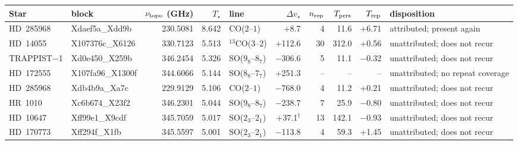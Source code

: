 \begin{tabular}{@{}l@{~}l@{~}r@{~}r@{~}l@{~}r@{~~}r@{~}r@{~}r@{~}l@{}}
\hline
Star & block & $\nu_{\rm topo}$ (GHz) & $T_\star$ & line & $\Delta v_\star$ & $n_{\rm rep}$ & $T_{\rm pers}$ & $T_{\rm rep}$ & disposition \\
\hline
HD~285968 & Xdaef5a\_Xdd9b & 230.5081 & 8.642 & CO($2$--$1$) & +8.7 & 4 & 11.6 & +6.71 & attributed; present again \\
HD~14055 & X107376c\_X6126 & 330.7123 & 5.513 & $^{13}$CO($3$--$2$) & +112.6 & 30 & 312.0 & +0.56 & unattributed; does not recur \\
TRAPPIST$-$1 & Xd0e450\_X259b & 346.2454 & 5.326 & SO($9_{8}$--$8_{7}$) & \ensuremath{-}306.6 & 5 & 11.1 & \ensuremath{-}0.32 & unattributed; does not recur \\
HD~172555 & X107fa96\_X1300f & 344.6066 & 5.144 & SO($8_{8}$--$7_{7}$) & +251.3 & -- & -- & -- & unattributed; no repeat coverage \\
HD~285968 & Xdb4b9a\_Xa7c & 229.9129 & 5.106 & CO($2$--$1$) & \ensuremath{-}768.0 & 4 & 11.2 & +0.21 & unattributed; does not recur \\
HR~1010 & Xc6b674\_X23f2 & 346.2301 & 5.044 & SO($9_{8}$--$8_{7}$) & \ensuremath{-}238.7 & 7 & 25.9 & \ensuremath{-}0.80 & unattributed; does not recur \\
HD~10647 & Xff99e1\_X9cdf & 345.7059 & 5.017 & SO($2_{3}$--$2_{1}$) & +37.1$^{\dagger}$ & 13 & 142.1 & \ensuremath{-}0.93 & unattributed; does not recur \\
HD~170773 & Xff294f\_X1fb & 345.5597 & 5.001 & SO($2_{3}$--$2_{1}$) & \ensuremath{-}113.8 & 4 & 59.3 & +1.45 & unattributed; does not recur \\
\hline
\end{tabular}
